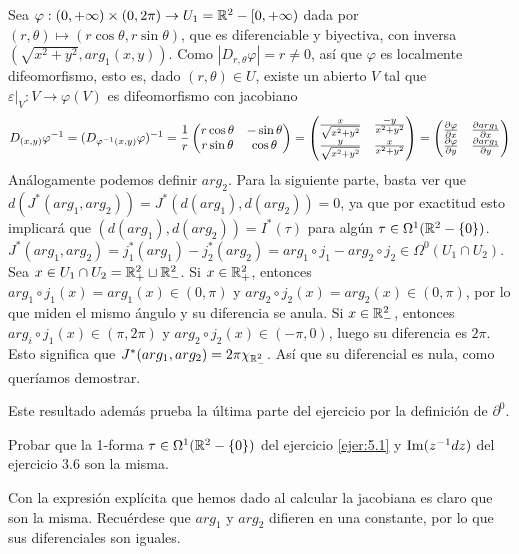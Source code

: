 \documentclass[twoside]{article}
\begin{document}
\begin{solucion}
Sea $\varphi:(0,+\infty)\times (0,2\pi)\to U_1=\mathbb{R}^2-[0,+\infty)$ dada por $(r,\theta)\mapsto (r\cos\theta, r\sin\theta)$, que es diferenciable y biyectiva,   con inversa $(\sqrt{x^2+y^2}, arg_1(x,y))$. Como $|D_{r,\theta}\varphi|=r\neq 0$, así que $\varphi$ es localmente difeomorfismo, esto es, dado $(r,\theta)\in U$, existe un abierto $V$ tal que $\varepsilon|_V: V\to\varphi(V)$ es difeomorfismo con jacobiano 
\[
D_{(x,y)}\varphi^{-1}=(D_{\varphi^{-1}(x,y)}\varphi)^{-1}=\frac{1}{r}\begin{pmatrix}
r\cos\theta & -\sin\theta\\
r\sin\theta & \cos\theta
\end{pmatrix}=\begin{pmatrix}
\frac{x}{\sqrt{x^2+y^2}} & \frac{-y}{x^2+y^2}\\
\frac{y}{\sqrt{x^2+y^2}} & \frac{x}{x^2+y^2}
\end{pmatrix}=\begin{pmatrix}
\frac{\partial \varphi}{\partial x} & \frac{\partial arg_1}{\partial x}\\
\frac{\partial \varphi}{\partial y} & \frac{\partial arg_1}{\partial y}
\end{pmatrix}
\]
Análogamente podemos definir $arg_2$. Para la siguiente parte, basta ver que $d(J^*(arg_1,arg_2))=J^*(d(arg_1),d(arg_2))=0$, ya que por exactitud esto implicará que $(d(arg_1),d(arg_2))=I^*(\tau)$ para algún $\tau\in\Omega^1(\mathbb{R}^2-\{0\})$. 
$J^*(arg_1,arg_2)=j^*_1(arg_1)-j_2^*(arg_2)=arg_1\circ j_1-arg_2\circ j_2\in\Omega^0(U_1\cap U_2)$. Sea $x\in U_1\cap U_2=\mathbb{R}^2_+\sqcup \mathbb{R}^2_-$. Si $x\in\mathbb{R}^2_+$, entonces $arg_1\circ j_1(x)=arg_1(x)\in (0,\pi)$ y $arg_2\circ j_2(x)=arg_2(x)\in (0,\pi)$, por lo que miden el mismo ángulo y su diferencia se anula. Si $x\in\mathbb{R}^2_-$, entonces $arg_i\circ j_1(x)\in (\pi,2\pi)$ y $arg_2\circ j_2(x)\in (-\pi, 0)$, luego su diferencia es $2\pi$. Esto significa que 
$J^*(arg_1,arg_2)=2\pi\chi_{\mathbb{R}^2_-}$. Así que su diferencial es nula, como queríamos demostrar.

Este resultado además prueba la última parte del ejercicio por la definición de $\partial^0$. 
\end{solucion}

\newpage

\begin{ejercicio}{5.2}
Probar que la 1-forma $\tau\in\Omega^1(\mathbb{R}^2-\{0\})$ del ejercicio \ref{ejer:5.1} y $\operatorname{Im}(z^{-1}dz)$ del ejercicio 3.6 son la misma. %
\end{ejercicio}
\begin{solucion}

Con la expresión explícita que hemos dado al calcular la jacobiana es claro que son la misma. Recuérdese que $arg_1$ y $arg_2$ difieren en una constante, por lo que sus diferenciales son iguales. 

\end{solucion}
\newpage
\end{document}
